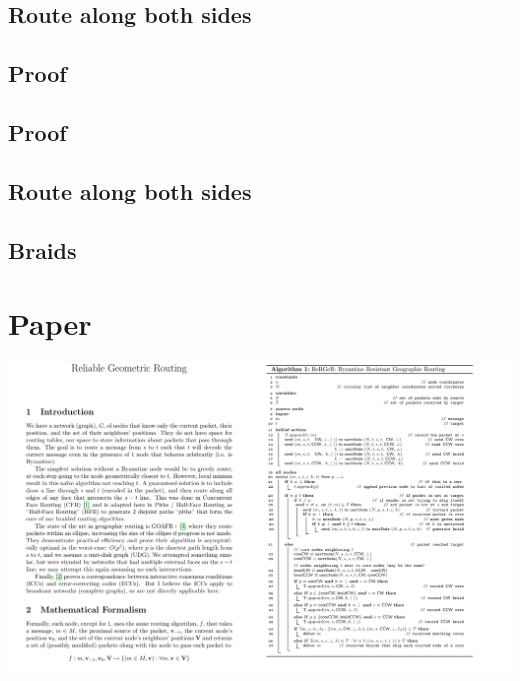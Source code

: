 \documentclass[11pt]{article}
\begin{document}
\subsection*{Route along both sides}
\label{sec:org566a85d}
\begin{center}

\end{center}
\subsection*{Proof}
\label{sec:org1ec1b9f}
\begin{center}

\end{center}
\subsection*{Proof}
\label{sec:org536fe6e}
\begin{center}

\end{center}
\subsection*{Route along both sides}
\label{sec:org870abee}
\begin{center}

\end{center}
\subsection*{Braids}
\label{sec:org45504d0}
\begin{center}

\end{center}
\section*{Paper}
\label{sec:org3755871}

\begin{center}
\includegraphics[width=.9\linewidth]{./img/paper.png}
\end{center}
\end{document}
